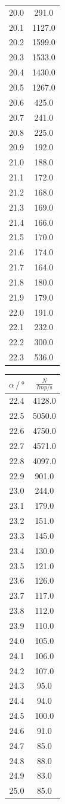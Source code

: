 \begin{table}
\begin{tabular}[t]{cc}
  20.0 & 291.0\\
  20.1 & 1127.0\\
  20.2 & 1599.0\\
  20.3 & 1533.0\\
  20.4 & 1430.0\\
  20.5 & 1267.0\\
  20.6 & 425.0\\
  20.7 & 241.0\\
  20.8 & 225.0\\
  20.9 & 192.0\\
  21.0 & 188.0\\
  21.1 & 172.0\\
  21.2 & 168.0\\
  21.3 & 169.0\\
  21.4 & 166.0\\
  21.5 & 170.0\\
  21.6 & 174.0\\
  21.7 & 164.0\\
  21.8 & 180.0\\
  21.9 & 179.0\\
  22.0 & 191.0\\
  22.1 & 232.0\\
  22.2 & 300.0\\
  22.3 & 536.0\\
  \bottomrule
  \end{tabular}
  \begin{tabular}[t]{cc}
  \toprule
  $\alpha \,/\, \si{\degree} $ & $\frac{N}{Imp/\si{\second}}$ \\
  \midrule
  22.4 & 4128.0\\
  22.5 & 5050.0\\
  22.6 & 4750.0\\
  22.7 & 4571.0\\
  22.8 & 4097.0\\
  22.9 & 901.0\\
  23.0 & 244.0\\
  23.1 & 179.0\\
  23.2 & 151.0\\
  23.3 & 145.0\\
  23.4 & 130.0\\
  23.5 & 121.0\\
  23.6 & 126.0\\
  23.7 & 117.0\\
  23.8 & 112.0\\
  23.9 & 110.0\\
  24.0 & 105.0\\
  24.1 & 106.0\\
  24.2 & 107.0\\
  24.3 & 95.0\\
  24.4 & 94.0\\
  24.5 & 100.0\\
  24.6 & 91.0\\
  24.7 & 85.0\\
  24.8 & 88.0\\
  24.9 & 83.0\\
  25.0 & 85.0\\
  \bottomrule
  \end{tabular}
  \label{tab:emmision2}
\end{table}

